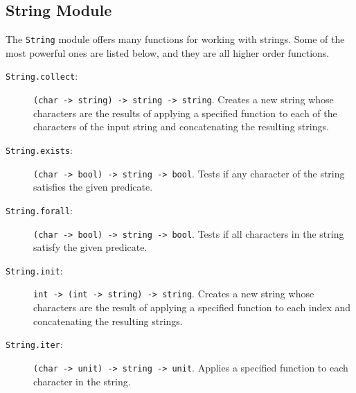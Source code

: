\subsection{String Module}
The \lstinline{String} module offers many functions for working with strings. Some of the most powerful ones are listed below, and they are all higher order functions.
\begin{description}
\item[\texttt{String.collect}:] \lstinline{(char -> string) -> string -> string}. Creates a new string whose characters are the results of applying a specified function to each of the characters of the input string and concatenating the resulting strings.
 \item[\texttt{String.exists}:] \lstinline{(char -> bool) -> string -> bool}. Tests if any character of the string satisfies the given predicate.
 \item[\texttt{String.forall}:] \lstinline{(char -> bool) -> string -> bool}. Tests if all characters in the string satisfy the given predicate.
\item[\texttt{String.init}:] \lstinline{int -> (int -> string) -> string}. Creates a new string whose characters are the result of applying a specified function to each index and concatenating the resulting strings.
\item[\texttt{String.iter}:] \lstinline{(char -> unit) -> string -> unit}. Applies a specified function to each character in the string.

\end{description}
